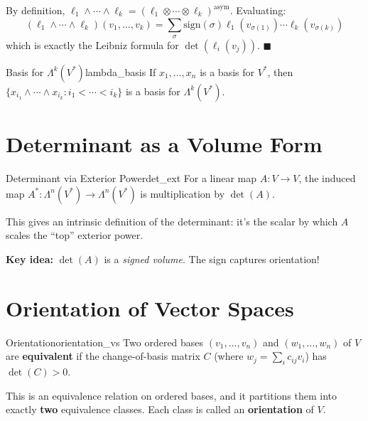 \documentclass[11pt, letterpaper, openany]{book}
\renewenvironment{proof}[1][\proofname]{%
  \tcolorbox[blanker, breakable, left=1em,
    before skip=1em, after skip=1em,
    borderline west={2pt}{0pt}{MagicTeal!50},
    colback=MagicCream,
    before upper={\textcolor{MagicTeal}{\sffamily\bfseries #1.}\space}
  ]%
}{%
  \hfill\textcolor{MagicTeal}{\ensuremath{\blacksquare}}\endtcolorbox%
}
\begin{document}
\begin{proof}
By definition, $\ell_1 \wedge \cdots \wedge \ell_k = (\ell_1 \otimes \cdots \otimes \ell_k)^{\text{asym}}$. Evaluating:
\[(\ell_1 \wedge \cdots \wedge \ell_k)(v_1, \ldots, v_k) = \sum_{\sigma} \text{sign}(\sigma) \ell_1(v_{\sigma(1)}) \cdots \ell_k(v_{\sigma(k)})\]
which is exactly the Leibniz formula for $\det(\ell_i(v_j))$.
\end{proof}

\begin{thm}{Basis for $\Lambda^k(V^*)$}{lambda_basis}
If $x_1, \ldots, x_n$ is a basis for $V^*$, then $\{x_{i_1} \wedge \cdots \wedge x_{i_k} : i_1 < \cdots < i_k\}$ is a basis for $\Lambda^k(V^*)$.
\end{thm}

\section{Determinant as a Volume Form}

\begin{thm}{Determinant via Exterior Power}{det_ext}
For a linear map $A: V \to V$, the induced map $A^*: \Lambda^n(V^*) \to \Lambda^n(V^*)$ is multiplication by $\det(A)$.
\end{thm}

This gives an intrinsic definition of the determinant: it's the scalar by which $A$ scales the ``top'' exterior power.

\textbf{Key idea:} $\det(A)$ is a \emph{signed volume}. The sign captures orientation!

\section{Orientation of Vector Spaces}

\begin{defn}{Orientation}{orientation_vs}
Two ordered bases $(v_1, \ldots, v_n)$ and $(w_1, \ldots, w_n)$ of $V$ are \textbf{equivalent} if the change-of-basis matrix $C$ (where $w_j = \sum_i c_{ij} v_i$) has $\det(C) > 0$.

This is an equivalence relation on ordered bases, and it partitions them into exactly \textbf{two} equivalence classes. Each class is called an \textbf{orientation} of $V$.
\end{defn}
\end{document}
